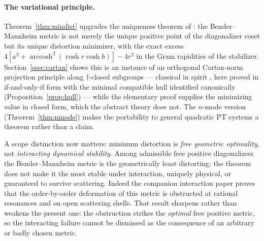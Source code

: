 \documentclass[11pt]{article}
\theoremstyle{definition}
\theoremstyle{remark}
\newcommand{\dg}{\dagger}
\newcommand{\arccosh}{\operatorname{arccosh}}
\begin{document}
\paragraph{The variational principle.}
Theorem~\ref{thm:mindist} upgrades the uniqueness theorem of
\cite{companion}: the Bender--Mannheim metric is not merely the unique
positive point of the diagonalizer coset but its unique distortion minimizer,
with the exact excess $4[a^2+\arccosh^2(\cosh r\cosh b)]-4r^2$ in the Gram
rapidities of the stabilizer.  Section~\ref{ssec:cartan} shows this is an
instance of an orthogonal Cartan-norm projection principle along
$\dg$-closed subgroups --- classical in spirit
\cite{Mostow1955,KempfNess1979}, here proved in if-and-only-if form with
the minimal compatible hull identified canonically
(Proposition~\ref{prop:hull}) --- while the elementary proof supplies the
minimizing value in closed form, which the abstract theory does not.  The
$n$-mode version (Theorem~\ref{thm:nmode}) makes the portability to
general quadratic PT systems a theorem rather than a claim.

A scope distinction now matters: minimum distortion is \emph{free
geometric optimality}, not \emph{interacting dynamical stability}.
Among admissible free positive diagonalizers the Bender--Mannheim metric
is the geometrically least distorting; the theorem does not make it the
most stable under interaction, uniquely physical, or guaranteed to
survive scattering.  Indeed the companion interaction paper
\cite{companionV} proves that the order-by-order deformation of this
metric is obstructed at rational resonances and on open scattering
shells.  That result sharpens rather than weakens the present one: the
obstruction strikes the \emph{optimal} free positive metric, so the
interacting failure cannot be dismissed as the consequence of an
arbitrary or badly chosen metric.
\end{document}
